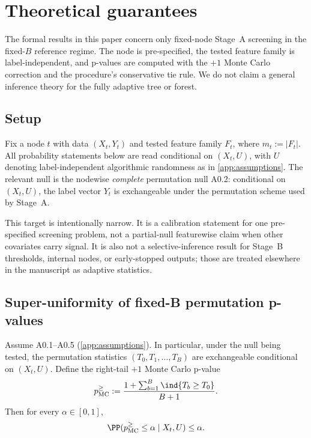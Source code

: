 \section{Theoretical guarantees}
\label{sec:theory}

The formal results in this paper concern only fixed-node Stage~A screening in
the fixed-$B$ reference regime. The node is pre-specified, the tested feature
family is label-independent, and p-values are computed with the $+1$ Monte
Carlo correction and the procedure's conservative tie rule. We do not claim a
general inference theory for the fully adaptive tree or forest.

\subsection{Setup}
\label{sec:theory-setup}

Fix a node $t$ with data $(X_t,Y_t)$ and tested feature family $F_t$, where
$m_t := |F_t|$. All probability statements below are read conditional on
$(X_t,U)$, with $U$ denoting label-independent algorithmic randomness as in
\cref{app:assumptions}. The relevant null is the nodewise \emph{complete}
permutation null A0.2: conditional on $(X_t,U)$, the label vector $Y_t$ is
exchangeable under the permutation scheme used by Stage~A.

This target is intentionally narrow. It is a calibration statement for one
pre-specified screening problem, not a partial-null featurewise claim when
other covariates carry signal. It is also not a selective-inference result for
Stage~B thresholds, internal nodes, or early-stopped outputs; those are
treated elsewhere in the manuscript as adaptive statistics.

\subsection{Super-uniformity of fixed-B permutation p-values}
\label{sec:theory-plusone}

\begin{theorem}
\label{them:plusone-superuniform}
Assume A0.1--A0.5 (\cref{app:assumptions}). In particular, under the null being
tested, the permutation statistics $(T_0,T_1,\dots,T_B)$ are exchangeable
conditional on $(X_t,U)$. Define the right-tail $+1$ Monte Carlo p-value
%
\begin{equation}
  p_{\mathrm{MC}}^{\ge}
  := \frac{1 + \sum_{b=1}^B \ind\{T_b \ge T_0\}}{B+1}.
\end{equation}
%
Then for every $\alpha \in [0,1]$,
%
\begin{equation}
  \PP(p_{\mathrm{MC}}^{\ge} \le \alpha \mid X_t,U) \le \alpha.
\end{equation}
\end{theorem}


